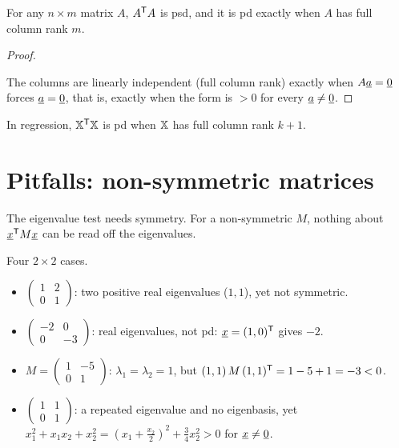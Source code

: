 \begin{result}
For any $n\times m$ matrix $A$, $A^{\mathsf{T}} A$ is psd, and it is pd exactly when $A$ has full column rank $m$.
\end{result}
\begin{proof}
\begin{deriv}
\end{deriv}
The columns are linearly independent (full column rank) exactly when $A\underline{a}=\underline{0}$ forces $\underline{a}=\underline{0}$, that is, exactly when the form is $>0$ for every $\underline{a}\ne\underline{0}$.
\end{proof}
In regression, $\mathbb{X}^{\mathsf{T}}\mathbb{X}$ is pd when $\mathbb{X}$ has full column rank $k+1$.

\section{Pitfalls: non-symmetric matrices}

The eigenvalue test needs symmetry. For a non-symmetric $M$, nothing about $\underline{x}^{\mathsf{T}} M\underline{x}$ can be read off the eigenvalues.

\begin{example}
Four $2\times2$ cases.
\begin{itemize}
  \item $\begin{pmatrix}1&2\\0&1\end{pmatrix}$: two positive real eigenvalues ($1,1$), yet not symmetric.
  \item $\begin{pmatrix}-2&0\\0&-3\end{pmatrix}$: real eigenvalues, not pd: $\underline{x}=(1,0)^{\mathsf{T}}$ gives $-2$.
  \item $M=\begin{pmatrix}1&-5\\0&1\end{pmatrix}$: $\lambda_1=\lambda_2=1$, but $(1,1)\,M\,(1,1)^{\mathsf{T}}=1-5+1=-3<0$.
  \item $\begin{pmatrix}1&1\\0&1\end{pmatrix}$: a repeated eigenvalue and no eigenbasis, yet $x_1^2+x_1x_2+x_2^2=(x_1+\tfrac{x_2}2)^2+\tfrac34x_2^2>0$ for $\underline{x}\ne\underline{0}$.
\end{itemize}
\end{example}

